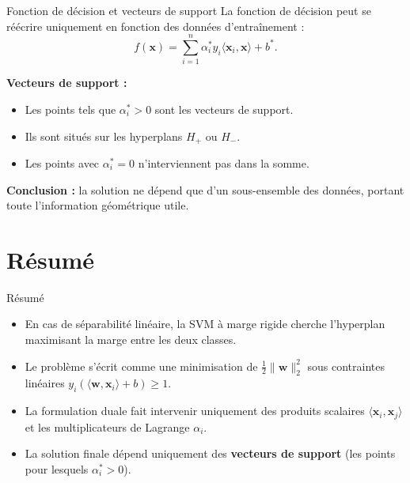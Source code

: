 \documentclass[aspectratio=169]{beamer}
\begin{document}
\begin{frame}{Fonction de décision et vecteurs de support}
  La fonction de décision peut se réécrire uniquement en fonction des données d'entraînement :
  \[
    f(\bm{x}) = \sum_{i=1}^n \alpha_i^\ast y_i \langle \bm{x}_i, \bm{x} \rangle + b^\ast.
  \]

  \vspace{0.3cm}
  \textbf{Vecteurs de support :}
  \begin{itemize}
    \item Les points tels que $\alpha_i^\ast > 0$ sont les vecteurs de support.
    \item Ils sont situés sur les hyperplans $H_+$ ou $H_-$.
    \item Les points avec $\alpha_i^\ast = 0$ n'interviennent pas dans la somme.
  \end{itemize}

  \vspace{0.3cm}
  \textbf{Conclusion :} la solution ne dépend que d'un sous-ensemble des données, portant toute
  l'information géométrique utile.
\end{frame}

\section{Résumé}

\begin{frame}{Résumé}
  \begin{itemize}
    \item En cas de séparabilité linéaire, la SVM à marge rigide cherche l'hyperplan
          maximisant la marge entre les deux classes.
    \item Le problème s'écrit comme une minimisation de $\frac{1}{2}\|\bm{w}\|_2^2$ sous contraintes
          linéaires $y_i(\langle \bm{w}, \bm{x}_i \rangle + b) \geq 1$.
    \item La formulation duale fait intervenir uniquement des produits scalaires
          $\langle \bm{x}_i, \bm{x}_j \rangle$ et les multiplicateurs de Lagrange $\alpha_i$.
    \item La solution finale dépend uniquement des \textbf{vecteurs de support}
          (les points pour lesquels $\alpha_i^\ast > 0$).
  \end{itemize}
\end{frame}
\end{document}
